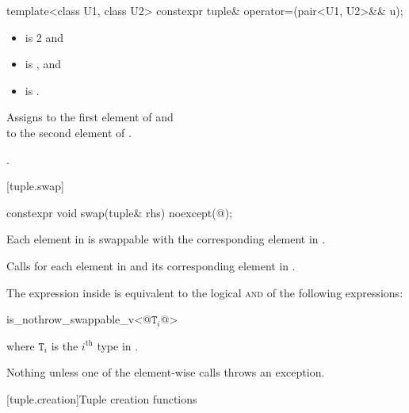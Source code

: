 %
%
\begin{itemdecl}
template<class U1, class U2> constexpr tuple& operator=(pair<U1, U2>&& u);
\end{itemdecl}

\begin{itemdescr}
\pnum
\constraints
\begin{itemize}
\item {} is 2 and
\item {} is , and
\item {} is .
\end{itemize}

\pnum
\effects
Assigns  to the first
element of  and\\  to the
second element of .

\pnum
\returns
{}.
\end{itemdescr}

[tuple.swap]{}

%
\begin{itemdecl}
constexpr void swap(tuple& rhs) noexcept(@\seebelow@);
\end{itemdecl}

\begin{itemdescr}
\pnum
\expects
Each element in  is swappable with
the corresponding element in .

\pnum
\effects
Calls  for each element in  and its
corresponding element in .

\pnum
\remarks
The expression inside  is equivalent to the logical
\textsc{and} of the following expressions:

\begin{codeblock}
is_nothrow_swappable_v<@$\mathtt{T}_i$@>
\end{codeblock}
where $\mathtt{T}_i$ is the $i^\text{th}$ type in .

\pnum
\throws
Nothing unless one of the element-wise  calls throws an exception.
\end{itemdescr}

[tuple.creation]{Tuple creation functions}

